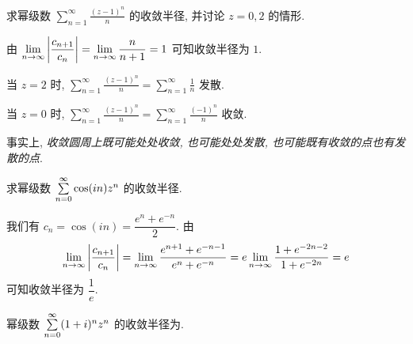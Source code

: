 \documentclass[nocolor,theme=doremi,lang=cn,11pt,chinese,twoside,openright,usesamecnt]{elegantbook}
\begin{document}
\begin{example}
	求幂级数 $\displaystyle\sum_{n=1}^\infty\frac{(z-1)^n}n$ 的收敛半径, 并讨论 $z=0,2$ 的情形.
\end{example}

\begin{solution}
	由 $\displaystyle\lim_{n\to\infty}\left|\frac{c_{n+1}}{c_n}\right|=\lim_{n\to\infty}\frac n{n+1}=1$ 可知收敛半径为 $1$.

	{当 $z=2$ 时, $\displaystyle\sum_{n=1}^\infty\frac{(z-1)^n}n=\sum_{n=1}^\infty\frac1n$ 发散.}

	{当 $z=0$ 时, $\displaystyle\sum_{n=1}^\infty\frac{(z-1)^n}n=\sum_{n=1}^\infty\frac{(-1)^n}n$ 收敛.}
\end{solution}

事实上, \emph{收敛圆周上既可能处处收敛, 也可能处处发散, 也可能既有收敛的点也有发散的点}.

\begin{example}
	求幂级数 $\sum\limits_{n=0}^\infty\cos(in)z^n$ 的收敛半径.
\end{example}

\begin{solution}
	我们有 $c_n=\cos(in)=\dfrac{e^n+e^{-n}}2$.
	{由
		\[\lim_{n\to\infty}\left|\frac{c_{n+1}}{c_n}\right|=\lim_{n\to\infty}\frac{e^{n+1}+e^{-n-1}}{e^n+e^{-n}}=e\lim_{n\to\infty}\frac{1+e^{-2n-2}}{1+e^{-2n}}=e\]
	可知收敛半径为 $\dfrac1e$.}
\end{solution}

\begin{exercise}
	幂级数 $\sum\limits_{n=0}^\infty(1+i)^nz^n$ 的收敛半径为.
\end{exercise}

% 
% 
% 
\end{document}
